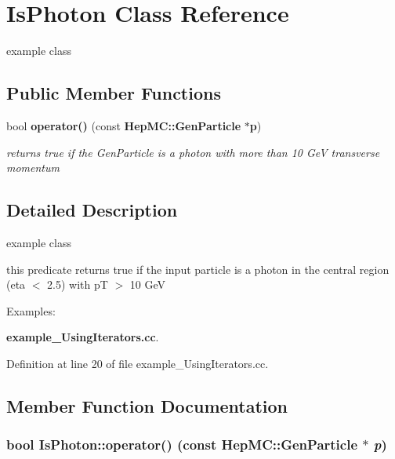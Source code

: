 \section{Is\-Photon Class Reference}
\label{classIsPhoton}
example class  


\subsection*{Public Member Functions}
\begin{CompactItemize}
\item 
bool {\bf operator()} (const {\bf Hep\-MC::Gen\-Particle} $\ast${\bf p})
\begin{CompactList}\small\item\em returns true if the Gen\-Particle is a photon with more than 10 Ge\-V transverse momentum \item\end{CompactList}\end{CompactItemize}


\subsection{Detailed Description}
example class 

this predicate returns true if the input particle is a photon in the central region (eta $<$ 2.5) with p\-T $>$ 10 Ge\-V \begin{Desc}
\item[Examples: ]\par


{\bf example\_\-Using\-Iterators.cc}.\end{Desc}




Definition at line 20 of file example\_\-Using\-Iterators.cc.

\subsection{Member Function Documentation}
\subsubsection{\setlength{\rightskip}{0pt plus 5cm}bool Is\-Photon::operator() (const {\bf Hep\-MC::Gen\-Particle} $\ast$ {\em p})\hspace{0.3cm}{\tt  [inline]}}\label{classIsPhoton_8ed40aa03fd51c1639078f75a0902f98}


